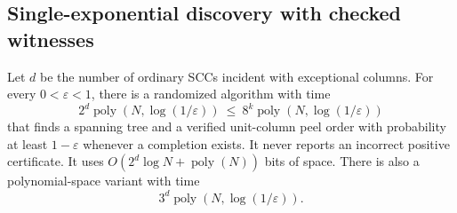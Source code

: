 \subsection{Single-exponential discovery with checked witnesses}

\begin{theorem}\label{thm:activation-fpt}
Let $d$ be the number of ordinary SCCs incident with exceptional columns.
For every $0<\varepsilon<1$, there is a randomized algorithm with time
\begin{equation}\label{eq:activation-time}
                 2^d\operatorname{poly}(N,\log(1/\varepsilon))
                      \ \leq\ 
                 8^k\operatorname{poly}(N,\log(1/\varepsilon))
\end{equation}
that finds a spanning tree and a verified unit-column peel order with
probability at least $1-\varepsilon$ whenever a completion exists.
It never reports an incorrect positive certificate.  It uses
$O(2^d\log N+\operatorname{poly}(N))$ bits of space.  There is also a
polynomial-space variant with time
\[
                   3^d\operatorname{poly}(N,\log(1/\varepsilon)).
\]
\end{theorem}
